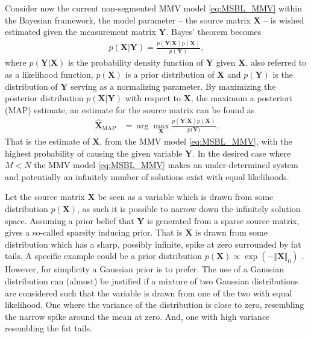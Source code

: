 Consider now the current non-segmented MMV model \eqref{eq:MSBL_MMV} within the Bayesian framework, the model parameter -- the source matrix $\textbf{X}$ -- is wished estimated given the measurement matrix $\textbf{Y}$.   
Bayes' theorem becomes 
\begin{align*}
p(\mathbf{X}|\mathbf{Y}) = \frac{p(\mathbf{Y}|\mathbf{X}) p(\mathbf{X})}{p(\mathbf{Y})},
\end{align*}  
where $p(\mathbf{Y}|\mathbf{X})$ is the probability density function of $\mathbf{Y}$ given $\mathbf{X}$, also referred to as a likelihood function, $p(\mathbf{X})$ is a prior distribution of $\mathbf{X}$ and $p(\mathbf{Y})$ is the distribution of $\mathbf{Y}$ serving as a normalizing parameter.
By maximizing the posterior distribution $p(\mathbf{X}|\mathbf{Y})$ with respect to $\mathbf{X}$, the maximum a posteriori (MAP) estimate, an estimate for the source matrix can be found as
\begin{align*}
\hat{\mathbf{X}}_{\text{MAP}} &= \arg \max_{\mathbf{X}} \frac{p(\mathbf{Y} \vert \mathbf{X}) p(\mathbf{X})}{p(\mathbf{Y)}}.
\end{align*}
That is the estimate of $\mathbf{X}$, from the MMV model \eqref{eq:MSBL_MMV}, with the highest probability of causing the given variable $\mathbf{Y}$. In the desired case where $M < N$ the MMV model \eqref{eq:MSBL_MMV} makes an under-determined system and potentially an infinitely number of solutions exist with equal likelihoods.  

Let the source matrix $\mathbf{X}$ be seen as a variable which is drawn from some distribution $p(\mathbf{X})$, as such it is possible to narrow down the infinitely solution space. 
Assuming a prior belief that $\mathbf{Y}$ is generated from a sparse source matrix, gives a so-called sparsity inducing prior. 
That is $\mathbf{X}$ is drawn from some distribution which has a sharp, possibly infinite, spike at zero surrounded by fat tails.
A specific example could be a prior distribution $p(\mathbf{X}) \propto \exp \left( - \Vert \mathbf{X} \Vert_0\right)$ \cite[p. 14]{phd_wipf}. 
However, for simplicity a Gaussian prior is to prefer. 
The use of a Gaussian distribution can (almost) be justified if a mixture of two Gaussian distributions are considered such that the variable is drawn from one of the two with equal likelihood. 
One where the variance of the distribution is close to zero, resembling the narrow spike around the mean at zero. 
And, one with high variance resembling the fat tails.       

